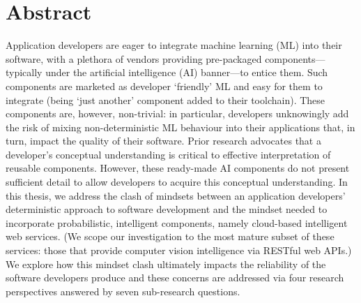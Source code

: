 \chapter*{Abstract}


Application developers are eager to integrate machine learning (ML) into their software, with a plethora of vendors providing pre-packaged components---typically under the artificial intelligence (AI) banner---to entice them.
Such components are marketed as developer `friendly' ML and easy for them to integrate (being `just another' component added to their toolchain). These components are, however, non-trivial: in particular, developers unknowingly add the risk of mixing non-deterministic ML behaviour into their applications that, in turn, impact the quality of their software.
Prior research advocates that a developer's conceptual understanding is critical to effective interpretation of reusable components. However, these ready-made AI components do not present sufficient detail to allow developers to acquire this conceptual understanding.
In this thesis, we address the clash of mindsets between an application developers' deterministic approach to software development and the mindset needed to incorporate probabilistic, intelligent components, namely cloud-based intelligent web services. (We scope our investigation to the most mature subset of these services: those that provide computer vision intelligence via RESTful web APIs.) We explore how this mindset clash ultimately impacts the reliability of the software developers produce and these concerns are addressed via four research perspectives answered by seven sub-research questions.

